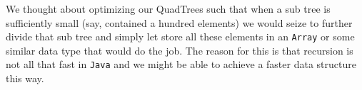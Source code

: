 We thought about optimizing our QuadTrees such that when a sub tree is sufficiently small (say, contained a hundred elements) we would seize to further divide that sub tree and simply let store all these elements in an \texttt{Array} or some similar data type that would do the job. The reason for this is that recursion is not all that fast in \texttt{Java} and we might be able to achieve a faster data structure this way.